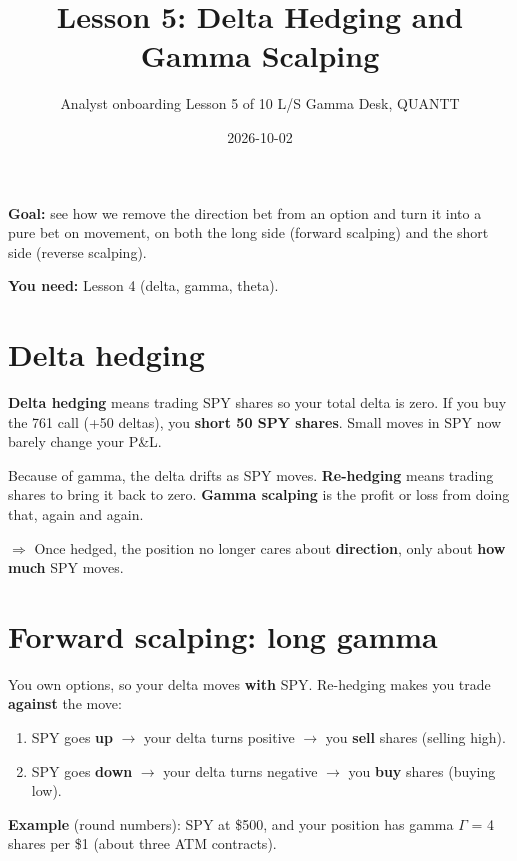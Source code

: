 \documentclass{article}
\title{Lesson 5: Delta Hedging and Gamma Scalping}
\author{Analyst onboarding \textperiodcentered{} Lesson 5 of 10 \textperiodcentered{} L/S Gamma Desk, QUANTT}
\date{2026-10-02}
\begin{document}
\maketitle

\textbf{Goal:} see how we remove the direction bet from an option and turn it into a pure bet on movement, on both the long side (forward scalping) and the short side (reverse scalping).

\textbf{You need:} Lesson 4 (delta, gamma, theta).

\section{Delta hedging}

\textbf{Delta hedging} means trading SPY shares so your total delta is zero. If you buy the 761 call (+50 deltas), you \textbf{short 50 SPY shares}. Small moves in SPY now barely change your P\&L.

Because of gamma, the delta drifts as SPY moves. \textbf{Re-hedging} means trading shares to bring it back to zero. \textbf{Gamma scalping} is the profit or loss from doing that, again and again.

\textbf{$\Rightarrow$} Once hedged, the position no longer cares about \textbf{direction}, only about \textbf{how much} SPY moves.

\section{Forward scalping: long gamma}

You own options, so your delta moves \textbf{with} SPY. Re-hedging makes you trade \textbf{against} the move:

\begin{enumerate}

\item SPY goes \textbf{up} \ensuremath{\rightarrow} your delta turns positive \ensuremath{\rightarrow} you \textbf{sell} shares (selling high).

\item SPY goes \textbf{down} \ensuremath{\rightarrow} your delta turns negative \ensuremath{\rightarrow} you \textbf{buy} shares (buying low).

\end{enumerate}

\textbf{Example} (round numbers): SPY at \$500, and your position has gamma \ensuremath{\Gamma} = 4 shares per \$1 (about three ATM contracts).
\end{document}
